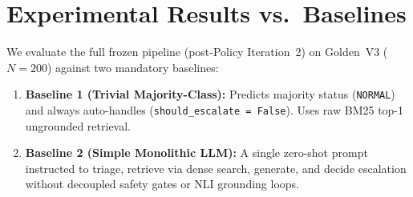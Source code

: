 \documentclass[10pt,twocolumn,a4paper]{article}
\begin{document}
\section{Experimental Results vs.\ Baselines}\label{sec:results}

We evaluate the full frozen pipeline (post-Policy Iteration~2) on
Golden~V3 ($N{=}200$) against two mandatory baselines:

\begin{enumerate}
  \item \textbf{Baseline 1 (Trivial Majority-Class):} Predicts majority
        status (\texttt{NORMAL}) and always auto-handles
        (\texttt{should\_escalate = False}). Uses raw BM25 top-1
        ungrounded retrieval.

  \item \textbf{Baseline 2 (Simple Monolithic LLM):} A single zero-shot
        prompt instructed to triage, retrieve via dense search, generate,
        and decide escalation without decoupled safety gates or NLI
        grounding loops.
\end{enumerate}
\end{document}
